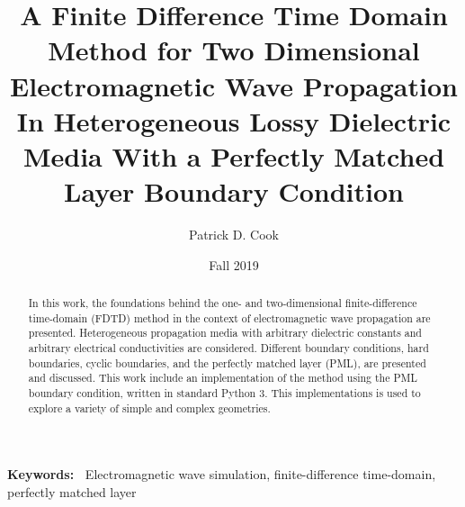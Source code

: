 \documentclass[12pt]{article}
\providecommand{\keywords}[1]{\textbf{\textbf{Keywords:~}} #1}
\begin{document}
\title{A Finite Difference Time Domain Method for Two Dimensional Electromagnetic Wave Propagation In Heterogeneous Lossy Dielectric Media With a Perfectly Matched Layer Boundary Condition}
\author{Patrick D. Cook}
\date{Fall 2019}
\begin{titlingpage}
\maketitle
\begin{abstract}
In this work, the foundations behind the one- and two-dimensional finite-difference time-domain (FDTD) method in the context of electromagnetic wave propagation are presented. Heterogeneous propagation media with arbitrary dielectric constants and arbitrary electrical conductivities are considered. Different boundary conditions, hard boundaries, cyclic boundaries, and the perfectly matched layer (PML), are presented and discussed. This work include an implementation of the method using the PML boundary condition, written in standard Python 3. This implementations is used to explore a variety of simple and complex geometries.
\end{abstract}

\keywords{Electromagnetic wave simulation, finite-difference time-domain, perfectly matched layer}
\end{titlingpage}
\newpage
\end{document}
